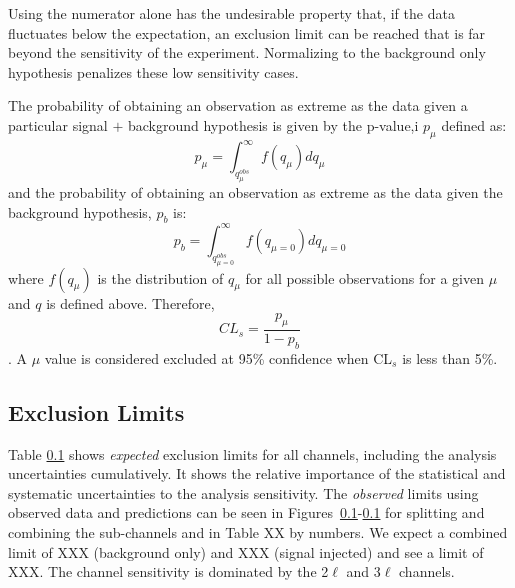 Using the numerator alone has the undesirable property that, if the data fluctuates below the expectation, an exclusion limit can be reached that is far beyond the sensitivity of the experiment. Normalizing to the background only hypothesis penalizes these low sensitivity cases.

The probability of obtaining an observation as extreme as the data given a particular signal $+$ background hypothesis is given by the p-value,i $p_{\mu}$ defined as:
\begin{equation}
 p_{\mu} = \int_{q_{\mu}^{obs}}^{\infty} f(q_{\mu}) dq_{\mu}
\end{equation}
and the probability of obtaining an observation as extreme as the data given the background hypothesis, $p_b$ is:
\begin{equation}
 p_{b} = \int_{q_{\mu=0}^{obs}}^{\infty} f(q_{\mu=0}) dq_{\mu=0}
\end{equation}
where $f(q_{\mu})$ is the distribution of $q_{\mu}$ for all possible observations for a given $\mu$ and $q$ is defined above. Therefore,
\begin{equation}
 CL_{s} = \frac{p_{\mu}}{1-p_b}
\end{equation}
. A $\mu$ value is considered excluded at 95\% confidence when CL$_{s}$ is less than 5\%. 

\subsection{Exclusion Limits}

Table \ref{} shows \textit{expected} exclusion limits for all channels, including the analysis uncertainties cumulatively. It shows the relative importance of the statistical and systematic uncertainties to the analysis sensitivity. The \textit{observed} limits using observed data and predictions can be seen in Figures~\ref{}-\ref{} for splitting and combining the sub-channels and in Table XX by numbers. We expect a combined limit of XXX (background only) and XXX (signal injected) and see a limit of XXX. The channel sensitivity is dominated by the 2$\ell$ and 3$\ell$ channels.

